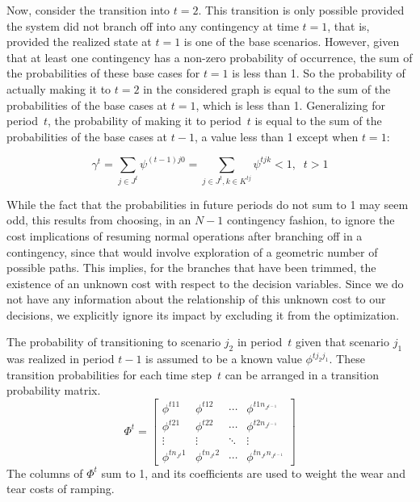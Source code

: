 \documentclass[12pt]{article}
\numberwithin{equation}{section}
\numberwithin{table}{section}
\numberwithin{figure}{section}
\begin{document}
Now, consider the transition into $t=2$. This transition is only possible provided the system did not branch off into any contingency at time $t=1$, that is, provided the realized state at $t=1$ is one of the base scenarios. However, given that at least one contingency has a non-zero probability of occurrence, the sum of the probabilities of these base cases for $t=1$ is less than 1. So the probability of actually making it to $t=2$ in the considered graph is equal to the sum of the probabilities of the base cases at $t=1$, which is less than 1. Generalizing for period~$t$, the probability of making it to period~$t$ is equal to the sum of the probabilities of the base cases at $t-1$, a value less than 1 except when $t=1$:

\begin{equation}
\gamma^t = \sum_{j \in J^t} \psi^{(t-1)j0} = \sum_{j \in J^t, k \in K^{tj}} \psi^{tjk} < 1,\;\; t>1
\end{equation}

While the fact that the probabilities in future periods do not sum to 1 may seem odd, this results from choosing, in an $N-1$ contingency fashion, to ignore the cost implications of resuming normal operations after branching off in a contingency, since that would involve exploration of a geometric number of possible paths. This implies, for the branches that have been trimmed, the existence of an unknown cost with respect to the decision variables. Since we do not have any information about the relationship of this unknown cost to our decisions, we explicitly ignore its impact by excluding it from the optimization.

The probability of transitioning to scenario $j_2$ in period~$t$ given that scenario $j_1$ was realized in period $t-1$ is assumed to be a known value $\phi^{tj_2j_1}$. These transition probabilities for each time step~$t$ can be arranged in a transition probability matrix.
\begin{equation}
\Phi^t = \left[ \begin{array}{cccc} \phi^{t11} & \phi^{t12} & \cdots & \phi^{t1n_{J^{t-1}}} \\
                                                         \phi^{t21} & \phi^{t22} & \cdots & \phi^{t2n_{J^{t-1}}} \\
                                                         \vdots       &   \vdots     & \ddots & \vdots \\
                                                   \phi^{tn_{J^t}1} &  \phi^{tn_{J^t}2} &  \cdots &  \phi^{tn_{J^t}n_{J^{t-1}}}
                       \end{array}
                  \right]
\label{eq:transmat}
\end{equation}
The columns of $\Phi^t$ sum to 1, and its coefficients are used to weight the wear and tear costs of ramping.
\end{document}
